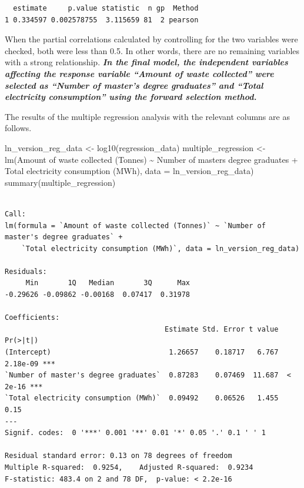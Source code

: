 \documentclass[
  11pt,
  a4paper,
  DIV=11,
  numbers=noendperiod]{scrartcl}
\newenvironment{Shaded}{\begin{snugshade}}{\end{snugshade}}
\newcommand{\AttributeTok}[1]{\textcolor[rgb]{0.40,0.45,0.13}{#1}}
\newcommand{\FunctionTok}[1]{\textcolor[rgb]{0.28,0.35,0.67}{#1}}
\newcommand{\NormalTok}[1]{\textcolor[rgb]{0.00,0.23,0.31}{#1}}
\newcommand{\OtherTok}[1]{\textcolor[rgb]{0.00,0.23,0.31}{#1}}
\newcommand{\SpecialCharTok}[1]{\textcolor[rgb]{0.37,0.37,0.37}{#1}}
\newcommand{\StringTok}[1]{\textcolor[rgb]{0.13,0.47,0.30}{#1}}
\begin{document}
\begin{verbatim}
  estimate     p.value statistic  n gp  Method
1 0.334597 0.002578755  3.115659 81  2 pearson
\end{verbatim}

When the partial correlations calculated by controlling for the two
variables were checked, both were less than 0.5. In other words, there
are no remaining variables with a strong relationship. \textbf{\emph{In
the final model, the independent variables affecting the response
variable ``Amount of waste collected'' were selected as ``Number of
master's degree graduates'' and ``Total electricity consumption'' using
the forward selection method.}}

The results of the multiple regression analysis with the relevant
columns are as follows.

\begin{Shaded}
\begin{Highlighting}[]
\NormalTok{ln\_version\_reg\_data }\OtherTok{\textless{}{-}} \FunctionTok{log10}\NormalTok{(regression\_data)}
\NormalTok{multiple\_regression }\OtherTok{\textless{}{-}} \FunctionTok{lm}\NormalTok{(}\StringTok{\textasciigrave{}}\AttributeTok{Amount of waste collected (Tonnes)}\StringTok{\textasciigrave{}} \SpecialCharTok{\textasciitilde{}} \StringTok{\textasciigrave{}}\AttributeTok{Number of master\textquotesingle{}s degree graduates}\StringTok{\textasciigrave{}} \SpecialCharTok{+} \StringTok{\textasciigrave{}}\AttributeTok{Total electricity consumption (MWh)}\StringTok{\textasciigrave{}}\NormalTok{, }\AttributeTok{data =}\NormalTok{ ln\_version\_reg\_data) }
\FunctionTok{summary}\NormalTok{(multiple\_regression)}
\end{Highlighting}
\end{Shaded}

\begin{verbatim}

Call:
lm(formula = `Amount of waste collected (Tonnes)` ~ `Number of master's degree graduates` + 
    `Total electricity consumption (MWh)`, data = ln_version_reg_data)

Residuals:
     Min       1Q   Median       3Q      Max 
-0.29626 -0.09862 -0.00168  0.07417  0.31978 

Coefficients:
                                      Estimate Std. Error t value Pr(>|t|)    
(Intercept)                            1.26657    0.18717   6.767 2.18e-09 ***
`Number of master's degree graduates`  0.87283    0.07469  11.687  < 2e-16 ***
`Total electricity consumption (MWh)`  0.09492    0.06526   1.455     0.15    
---
Signif. codes:  0 '***' 0.001 '**' 0.01 '*' 0.05 '.' 0.1 ' ' 1

Residual standard error: 0.13 on 78 degrees of freedom
Multiple R-squared:  0.9254,    Adjusted R-squared:  0.9234 
F-statistic: 483.4 on 2 and 78 DF,  p-value: < 2.2e-16
\end{verbatim}
\end{document}
